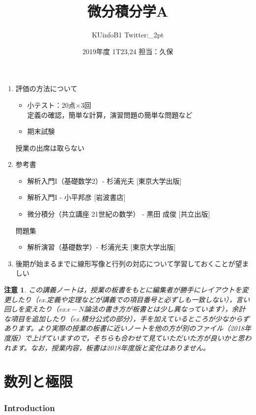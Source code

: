\documentclass[dvipdfmx,a4j,10pt]{jsarticle}
\title{微分積分学A}
\author{KUinfoB1 Twitter:\_2pt}
\author{2019年度 1T23,24 担当：久保}
\date{}
\theoremstyle{mystyle1}
\theoremstyle{mystyle2}
\newtheorem{note}{注意}
\begin{document}
\maketitle
\begin{enumerate}
\item 評価の方法について
	\begin{itemize}
		\item 小テスト：20点$\times$3回\\
			定義の確認，簡単な計算，演習問題の簡単な問題など
		\item 期末試験
	\end{itemize}
	授業の出席は取らない
\item 参考書
	\begin{itemize}
		\item 解析入門I（基礎数学2）- 杉浦光夫 [東京大学出版]
		\item 解析入門I - 小平邦彦 [岩波書店]
		\item 微分積分（共立講座 21世紀の数学） - 黒田 成俊 [共立出版]
	\end{itemize}
	問題集
		\begin{itemize}
		\item 解析演習（基礎数学）- 杉浦光夫 [東京大学出版]
	\end{itemize}
\item 後期が始まるまでに線形写像と行列の対応について学習しておくことが望ましい
\end{enumerate}

\begin{note}
	この講義ノートは，授業の板書をもとに編集者が勝手にレイアウトを変更したり（ex.定義や定理などが講義での項目番号と必ずしも一致しない），言い回しを変えたり（ex.$\epsilon-N$論法の書き方が板書とは少し異なっています），余計な項目を追加したり（ex.積分公式の部分），手を加えているところが少なからずあります。より実際の授業の板書に近いノートを他の方が別のファイル（2018年度版）で上げていますので，そちらも合わせて見ていただいた方が良いかと思われます。なお，授業内容，板書は2018年度版と変化はありません。
\end{note}

\newpage

\tableofcontents

\newpage

\part{数列と極限}
\section{Introduction}
\end{document}
